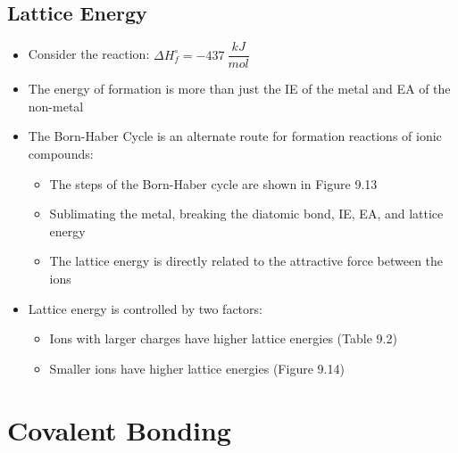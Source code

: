 \documentclass[12pt, openany, letterpaper]{memoir}
\begin{document}
\section{Lattice Energy}
\begin{itemize}
	\item Consider the reaction:  \hspace{1em}$\Delta H^\circ_f = -437~\dfrac{kJ}{mol}$
	\item The energy of formation is more than just the IE of the metal and EA of the non-metal
	\item The Born-Haber Cycle is an alternate route for formation reactions of ionic compounds:
	\begin{itemize}
		\item The steps of the Born-Haber cycle are shown in Figure 9.13
		\item Sublimating the metal, breaking the diatomic bond, IE, EA, and lattice energy
		\item The lattice energy is directly related to the attractive force between the ions
	\end{itemize}
	\item Lattice energy is controlled by two factors:
	\begin{itemize}
		\item Ions with larger charges have higher lattice energies (Table 9.2)
		\item Smaller ions have higher lattice energies (Figure 9.14)
	\end{itemize}
\end{itemize}

\chapter{Covalent Bonding}
\end{document}
